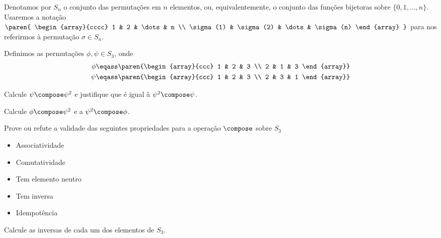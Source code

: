 \begin{definition}
	Denotamos por $S_n$ o conjunto das permutações em $n$ elementos, ou, equivalentemente, o conjunto das funções bijetoras sobre $\{0, 1, \dots, n\}$.
	Usaremos a notação
	$\paren{
		\begin{array}{cccc}
			       1  &        2  & \dots &        n \\
			\sigma(1) & \sigma(2) & \dots & \sigma(n)
		\end{array}
	}$
	para nos referirmos à permutação $\sigma \in S_n$.
\end{definition}

\begin{definition}
	Definimos as permutações $\phi, \psi \in S_3$, onde
	\begin{align*}
		\phi &\eqass \paren{\begin{array}{ccc} 1 & 2 & 3 \\ 2 & 1 & 3 \end{array}} \\
		\psi &\eqass \paren{\begin{array}{ccc} 1 & 2 & 3 \\ 2 & 3 & 1 \end{array}}
	\end{align*}
\end{definition}

\begin{exercise}
	Calcule $\psi \compose \psi^2$ e justifique que é igual à $\psi^2 \compose \psi$.
\end{exercise}

\begin{exercise}
	Calcule $\phi \compose \psi^2$ e a $\psi^2 \compose \phi$.
\end{exercise}

\begin{exercise}
	Prove ou refute a validade das seguintes propriedades para a operação $\compose$ sobre $S_3$
	\begin{itemize}
		\item Associatividade
		\item Comutatividade
		\item Tem elemento neutro
		\item Tem inversa
		\item Idempotência
	\end{itemize}
\end{exercise}

\begin{exercise}
	Calcule as inversas de cada um dos elementos de $S_3$.
\end{exercise}